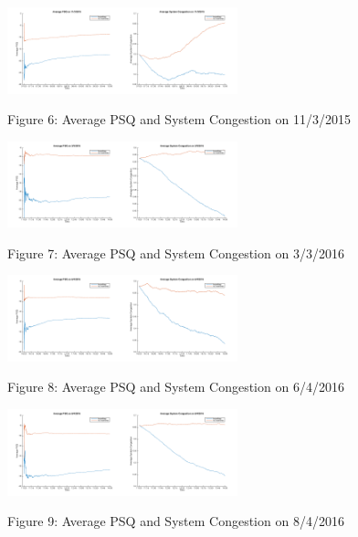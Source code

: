 \documentclass[times, 10pt,twocolumn]{article}
\begin{document}
\hfill \break
\centerline{\includegraphics[width=0.25\textwidth]{m4/Average_PSQ_Nov3.png}\includegraphics[width=0.25\textwidth]{m4/System_Congestion_Nov3.png}}
\centerline{Figure 6: Average PSQ and System Congestion on 11/3/2015}
\hfill \break
\centerline{\includegraphics[width=0.25\textwidth]{m4/Average_PSQ_Mar3.png}\includegraphics[width=0.25\textwidth]{m4/System_Congestion_Mar3.png}}
\centerline{Figure 7: Average PSQ and System Congestion on 3/3/2016}
\hfill \break
\centerline{\includegraphics[width=0.25\textwidth]{m4/Average_PSQ_June4.png}\includegraphics[width=0.25\textwidth]{m4/System_Congestion_June4.png}}
\centerline{Figure 8: Average PSQ and System Congestion on 6/4/2016}
\hfill \break
\centerline{\includegraphics[width=0.25\textwidth]{m4/Average_PSQ_Aug4.png}\includegraphics[width=0.25\textwidth]{m4/System_Congestion_Aug4.png}}
\centerline{Figure 9: Average PSQ and System Congestion on 8/4/2016}
\hfill \break
\end{document}
